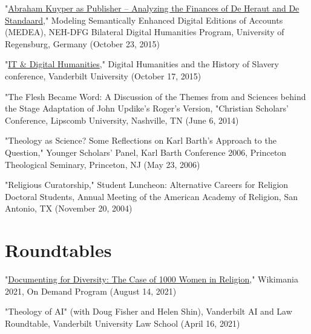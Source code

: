 \documentclass[]{res} %
\begin{document}
\begin{resume}
\begin{hangparas}{.25in}{1}"\href{http://medea.hypotheses.org/200}{Abraham Kuyper as Publisher – Analyzing the Finances of De Heraut and De Standaard}," Modeling Semantically Enhanced Digital Editions of Accounts (MEDEA), NEH-DFG Bilateral Digital Humanities Program, University of Regensburg, Germany (October 23, 2015)\end{hangparas}

\begin{hangparas}{.25in}{1}"\href{https://my.vanderbilt.edu/digitalhumanities/files/2015/10/Digital-Humanities-and-the-History-of-Slavery-3.jpg}{IT \& Digital Humanities}," Digital Humanities and the History of Slavery conference, Vanderbilt University (October 17, 2015)\end{hangparas}

\begin{hangparas}{.25in}{1}"The Flesh Became Word: A Discussion of the Themes from and Sciences behind the Stage Adaptation of John Updike's Roger's Version, "Christian Scholars’ Conference, Lipscomb University, Nashville, TN (June 6, 2014)\end{hangparas}

\begin{hangparas}{.25in}{1}"Theology as Science? Some Reflections on Karl Barth’s Approach to the Question," Younger Scholars' Panel, Karl Barth Conference 2006, Princeton Theological Seminary, Princeton, NJ (May 23, 2006)\end{hangparas}

\begin{hangparas}{.25in}{1}"Religious Curatorship," Student Luncheon: Alternative Careers for Religion Doctoral Students, Annual Meeting of the American Academy of Religion, San Antonio, TX (November 20, 2004)\end{hangparas}

\section{Roundtables}

\begin{hangparas}{.25in}{1}"\href{https://wikimania.wikimedia.org/wiki/2021:Submissions/Documenting_for_Diversity:_The_Case_of_1000_Women_in_Religion}{Documenting for Diversity: The Case of 1000 Women in Religion}," Wikimania 2021, On Demand Program (August 14, 2021)\end{hangparas}

\begin{hangparas}{.25in}{1}"Theology of AI" (with Doug Fisher and Helen Shin), Vanderbilt AI and Law Roundtable, Vanderbilt University Law School (April 16, 2021)\end{hangparas}


\end{resume}
\end{document}
